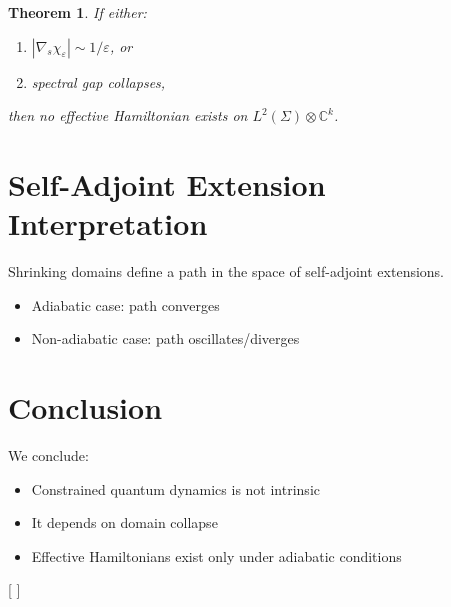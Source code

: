 \documentclass[11pt]{article}
\newtheorem{theorem}{Theorem}
\begin{document}
\begin{theorem}
If either:
\begin{enumerate}
\item $|\nabla_s \chi_\varepsilon| \sim 1/\varepsilon$, or
\item spectral gap collapses,
\end{enumerate}

then no effective Hamiltonian exists on $L^2(\Sigma)\otimes\mathbb{C}^k$.
\end{theorem}

\section{Self-Adjoint Extension Interpretation}

Shrinking domains define a path in the space of self-adjoint extensions.

\begin{itemize}
\item Adiabatic case: path converges
\item Non-adiabatic case: path oscillates/diverges
\end{itemize}

\section{Conclusion}

We conclude:

\begin{itemize}
\item Constrained quantum dynamics is not intrinsic
\item It depends on domain collapse
\item Effective Hamiltonians exist only under adiabatic conditions
\end{itemize}

[
]
\end{document}
